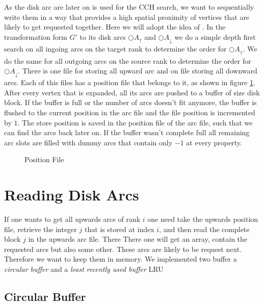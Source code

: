 As the disk arc are later on is used for the CCH search, we want to sequentially write them in a way that provides a high spatial proximity of vertices that are likely to get requested together. Here we will adopt the idea of \cite[Mobile Route Planning]{Sanders}. In the transformation form $G'$ to its disk arcs $\bigcirc A_\uparrow$ 
and $\bigcirc A_\downarrow$ we do a simple depth first search on all ingoing arcs on the target rank to determine the order for $\bigcirc A_\uparrow$. We do the same for all outgoing arcs on the source rank to determine the order for $\bigcirc A_\downarrow$.
There is one file for storing all upward arc and on file storing all downward arcs. Each of this files has a position file that belongs to it, as shown in figure \ref{fig:position_file}. After every vertex that is expanded, all its arcs are pushed to a buffer of size disk block. If the buffer is full or the number of arcs doesn't fit anymore,
the buffer is flushed to the current position in the arc file and the file position is incremented by $1$. The store position is saved in the position file of the arc file, such that we can find the arcs back later on. If the buffer wasn't complete full all remaining arc slots are filled with dummy arcs that contain only $-1$ at every property.


\begin{figure}
    \centering
    
    \caption{Position File}
    \label{fig:position_file}
\end{figure}

\section{Reading Disk Arcs}

If one wants to get all upwards arcs of rank $i$ one need take  the upwards position file, retrieve the integer $j$ that is stored at index $i$, and then read the complete block $j$ in the upwards arc file. There
There one will get an array, contain the requested arcs but also some other. These arcs are likely to be request next. Therefore we want to keep them in memory. We implemented two buffer a \textit{circular buffer} and a \textit{least recently used buffer} LRU

\subsection{Circular Buffer}

